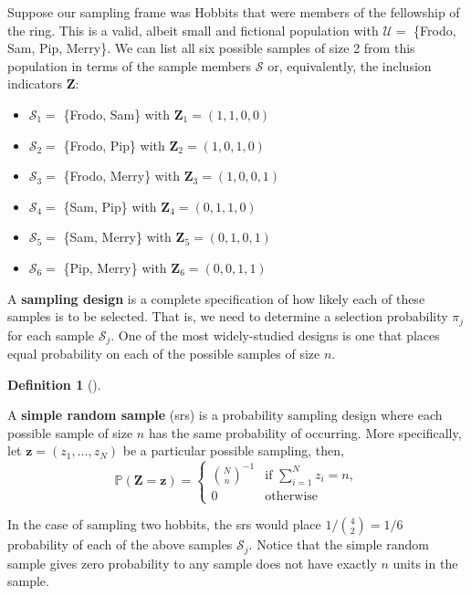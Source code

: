 \documentclass[
  letterpaper,
  DIV=11,
  numbers=noendperiod]{scrreprt}
\providecommand{\tightlist}{%
  \setlength{\itemsep}{0pt}\setlength{\parskip}{0pt}}\usepackage{longtable,booktabs,array}
\newcommand{\mb}{\symbf}
\renewcommand{\P}{\mathbb{P}}
\theoremstyle{definition}
\theoremstyle{definition}
\newtheorem{definition}{Definition}[chapter]
\theoremstyle{plain}
\theoremstyle{remark}
\begin{document}
Suppose our sampling frame was Hobbits that were members of the
fellowship of the ring. This is a valid, albeit small and fictional
population with \(\mathcal{U} =\) \{Frodo, Sam, Pip, Merry\}. We can
list all six possible samples of size 2 from this population in terms of
the sample members \(\mathcal{S}\) or, equivalently, the inclusion
indicators \(\mb{Z}\):

\begin{itemize}
\tightlist
\item
  \(\mathcal{S}_1 =\) \{Frodo, Sam\} with \(\mb{Z}_{1} = (1, 1, 0, 0)\)
\item
  \(\mathcal{S}_2 =\) \{Frodo, Pip\} with \(\mb{Z}_{2} = (1, 0, 1, 0)\)
\item
  \(\mathcal{S}_3 =\) \{Frodo, Merry\} with
  \(\mb{Z}_{3} = (1, 0, 0, 1)\)
\item
  \(\mathcal{S}_4 =\) \{Sam, Pip\} with \(\mb{Z}_{4} = (0, 1, 1, 0)\)
\item
  \(\mathcal{S}_5 =\) \{Sam, Merry\} with \(\mb{Z}_{5} = (0, 1, 0, 1)\)
\item
  \(\mathcal{S}_6 =\) \{Pip, Merry\} with \(\mb{Z}_{6} = (0, 0, 1, 1)\)
\end{itemize}

A \textbf{sampling design} is a complete specification of how likely
each of these samples is to be selected. That is, we need to determine a
selection probability \(\pi_j\) for each sample \(\mathcal{S}_j\). One
of the most widely-studied designs is one that places equal probability
on each of the possible samples of size \(n\).

\begin{definition}[]\protect\hypertarget{def-srs}{}\label{def-srs}

A \textbf{simple random sample} (srs) is a probability sampling design
where each possible sample of size \(n\) has the same probability of
occurring. More specifically, let \(\mb{z} = (z_{1}, \ldots, z_{N})\) be
a particular possible sampling, then, \[
\P(\mb{Z} = \mb{z}) = \begin{cases}
{N \choose n}^{-1} &\text{if } \sum_{i=1}^N z_i = n,\\
0 & \text{otherwise}
\end{cases}
\]

\end{definition}

In the case of sampling two hobbits, the srs would place
\(1/{4\choose 2} = 1/6\) probability of each of the above samples
\(\mathcal{S}_j\). Notice that the simple random sample gives zero
probability to any sample does not have exactly \(n\) units in the
sample.
\end{document}
